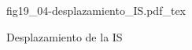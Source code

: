 \begin{figure}[h]
\centering
\def\svgwidth{0.5\textwidth}
{fig19_04-desplazamiento_IS.pdf_tex}
\caption{Desplazamiento de la IS}
\label{fig19_04-desplazamiento_IS}
\end{figure}